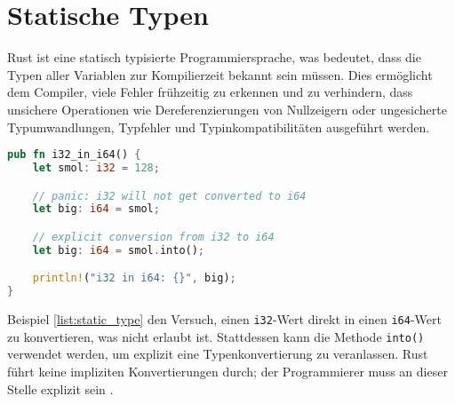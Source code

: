 
\chapter{Statische Typen}

Rust ist eine statisch typisierte Programmiersprache, was bedeutet, dass die Typen aller Variablen zur Kompilierzeit bekannt sein müssen. 
Dies ermöglicht dem Compiler, viele Fehler frühzeitig zu erkennen und zu verhindern, dass unsichere Operationen wie Dereferenzierungen von Nullzeigern oder ungesicherte Typumwandlungen, Typfehler und Typinkompatibilitäten ausgeführt werden. 

\begin{lstlisting}[language=Rust, caption={i32 in i64}, label=list:static_type]
pub fn i32_in_i64() {
    let smol: i32 = 128;

    // panic: i32 will not get converted to i64
    let big: i64 = smol;

    // explicit conversion from i32 to i64 
    let big: i64 = smol.into();

    println!("i32 in i64: {}", big);
}
\end{lstlisting}

\noindent
Beispiel \ref{list:static_type} den Versuch, einen \texttt{i32}-Wert direkt in einen \texttt{i64}-Wert zu konvertieren, was nicht erlaubt ist. 
Stattdessen kann die Methode \texttt{into()} verwendet werden, um explizit eine Typenkonvertierung zu veranlassen. 
Rust führt keine impliziten Konvertierungen durch; der Programmierer muss an dieser Stelle explizit sein \cite[Kapitel 1. Types]{drysdale2024}.

